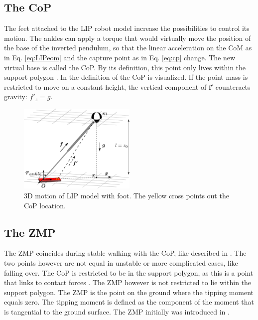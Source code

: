 \subsection{The \ac{CoP}}
The feet attached to the \ac{LIP} robot model increase the possibilities to control its motion. The ankles can apply a torque that would virtually move the position of the base of the inverted pendulum, so that the linear acceleration on the \ac{CoM} as in Eq. \eqref{eq:LIPeom} and the capture point as in Eq. \eqref{eq:cp} change. The new virtual base is called the \ac{CoP}. By its definition, this point only lives within the support polygon \cite{vukobratovic2004zero}. In  the definition of the \ac{CoP} is visualized. If the point mass is restricted to move on a constant height, the vertical component of $\boldsymbol{f'}$ counteracts gravity: $f'_z=g$. 
\begin{figure}[h]
\centering
\includegraphics[width=0.5\textwidth]{STYLESTUFF/3DCoMwithfoot.png}
\caption{\ac{3D} motion of \ac{LIP} model with foot. The yellow cross points out the \ac{CoP} location.}
\label{fig:3dlipfoot}
\end{figure}
\subsection{The \ac{ZMP}}
The \ac{ZMP} coincides during stable walking with the \ac{CoP}, like described in \cite{vukobratovic2004zero}. The two points however are not equal in unstable or more complicated cases, like falling over.  The \ac{CoP} is restricted to be in the support polygon, as this is a point that links to contact forces \cite{sardain2004forces}. The \ac{ZMP} however is not restricted to lie within the support polygon. The \ac{ZMP} is the point on the ground where the tipping moment equals zero. The tipping moment is defined as the component of the moment that is tangential to the ground surface. The \ac{ZMP} initially was introduced in \cite{vukobratovic1969contribution}.


